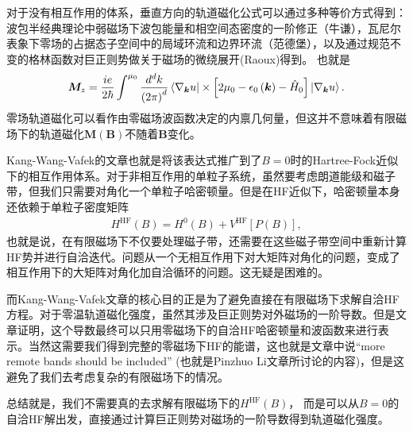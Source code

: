 \documentclass[10pt, oneside]{article}
\newcommand{\mr}[1]{\mathrm{#1}}
\newcommand{\p}[1]{\left(#1\right)}
\newcommand{\bb}[1]{\left[#1\right]}
\begin{document}
对于没有相互作用的体系，垂直方向的轨道磁化公式可以通过多种等价方式得到：波包半经典理论中弱磁场下波包能量和相空间态密度的一阶修正（牛谦），瓦尼尔表象下零场的占据态子空间中的局域环流和边界环流（范德堡），以及通过规范不变的格林函数对巨正则势做关于磁场的微绕展开(Raoux)得到。 也就是
\begin{align}
    \bm{M}_{z} = \frac{i e}{2 \hbar}\int^{\mu_0} \frac{d^d k}{\p{2 \pi}^{d}} \braket{\nabla_{\bm{k}} u | \times \bb{2 \mu_0 - \epsilon_0 \p{\bm{k}} - \hat{H}_0}| \nabla_{\bm{k}} u}.
\end{align}  
零场轨道磁化可以看作由零磁场波函数决定的内禀几何量，但这并不意味着有限磁场下的轨道磁化\(\bm{M} \p{\bm{B}}\)不随着\(\bm{B}\)变化。

Kang-Wang-Vafek的文章也就是将该表达式推广到了\(B = 0\)时的Hartree-Fock近似下的相互作用体系。对于非相互作用的单粒子系统，虽然要考虑朗道能级和磁子带，但我们只需要对角化一个单粒子哈密顿量。但是在HF近似下，哈密顿量本身还依赖于单粒子密度矩阵
\begin{align}
    H^{\mr{HF}} \p{B} = H^{0} \p{B} + V^{\mr{HF}} \bb{P \p{B}},
\end{align}
也就是说，在有限磁场下不仅要处理磁子带，还需要在这些磁子带空间中重新计算HF势并进行自洽迭代。问题从一个无相互作用下对大矩阵对角化的问题，变成了相互作用下的大矩阵对角化加自洽循环的问题。这无疑是困难的。

而Kang-Wang-Vafek文章的核心目的正是为了避免直接在有限磁场下求解自洽HF方程。对于零温轨道磁化强度，虽然其涉及巨正则势对外磁场的一阶导数。但是文章证明，这个导数最终可以只用零磁场下的自洽HF哈密顿量和波函数来进行表示。当然这需要我们得到完整的零磁场下HF的能谱，这也就是文章中说“more remote bands should be included” (也就是Pinzhuo Li文章所讨论的内容)，但是这避免了我们去考虑复杂的有限磁场下的情况。

总结就是，我们不需要真的去求解有限磁场下的\(H^{\mr{HF}} \p{B}\)， 而是可以从\(B = 0\)的自洽HF解出发，直接通过计算巨正则势对磁场的一阶导数得到轨道磁化强度。
\end{document}
